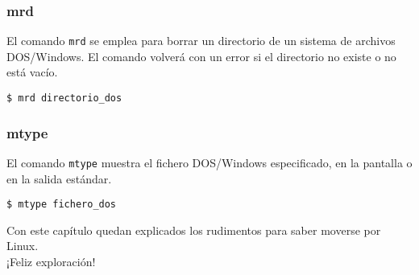 \subsubsection{mrd}

El comando {\tt mrd} se emplea para borrar un directorio de un sistema
de  archivos  DOS/Windows. El  comando  volverá  con  un error  si  el
directorio no existe o no está vacío.

\begin{verbatim}
$ mrd directorio_dos
\end{verbatim}

\subsubsection{mtype}

El  comando  {\tt mtype}  muestra  el fichero  DOS/Windows
especificado, en la pantalla o en la salida estándar.

\begin{verbatim}
$ mtype fichero_dos
\end{verbatim}

Con este capítulo quedan explicados los rudimentos para saber moverse
por Linux.
\\
¡Feliz exploración!
